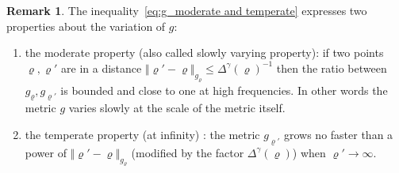 \documentclass[10pt]{amsart}
\theoremstyle{definition}\newtheorem{defi}[theo]{Definition}\newtheorem{rema}[theo]{Remark}\newtheorem{exam}[theo]{Example}\newtheorem{exem}[theo]{Example}\newtheorem{nota}[theo]{Notation}
\begin{document}
\begin{rema}
The inequality~\eqref{eq:g_moderate and temperate} expresses two properties about the variation of $g$:
\begin{enumerate}
\item the moderate property (also called slowly varying property): if two points $\varrho,\varrho'$ are in a distance $\Vert \varrho'-\varrho\Vert _{g_{\varrho}}\leq\Delta^{\gamma}(\varrho)^{-1}$ then the ratio between $g_{\varrho},g_{\varrho'}$ is bounded and close to one at high frequencies. In other words the metric $g$ varies slowly at the scale of the metric itself.
\item the temperate property (at infinity) : the metric $g_{\varrho'}$ grows no faster than a power of $\Vert \varrho'-\varrho\Vert _{g_{\varrho}}$ (modified by the factor $\Delta^{\gamma}(\varrho)$) when $\varrho'\to\infty$.
\end{enumerate}
\end{rema}
\end{document}
